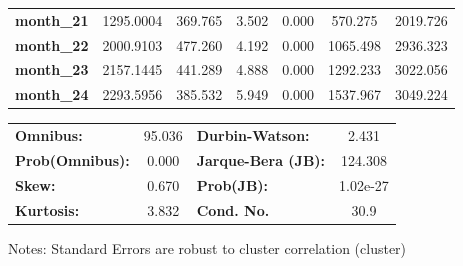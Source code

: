 \begin{center}
\begin{tabular}{lcccccc}
\textbf{month\_21}    &    1295.0004  &      369.765     &     3.502  &         0.000        &      570.275    &     2019.726     \\
\textbf{month\_22}    &    2000.9103  &      477.260     &     4.192  &         0.000        &     1065.498    &     2936.323     \\
\textbf{month\_23}    &    2157.1445  &      441.289     &     4.888  &         0.000        &     1292.233    &     3022.056     \\
\textbf{month\_24}    &    2293.5956  &      385.532     &     5.949  &         0.000        &     1537.967    &     3049.224     \\
\bottomrule
\end{tabular}
\begin{tabular}{lclc}
\textbf{Omnibus:}       & 95.036 & \textbf{  Durbin-Watson:     } &    2.431  \\
\textbf{Prob(Omnibus):} &  0.000 & \textbf{  Jarque-Bera (JB):  } &  124.308  \\
\textbf{Skew:}          &  0.670 & \textbf{  Prob(JB):          } & 1.02e-27  \\
\textbf{Kurtosis:}      &  3.832 & \textbf{  Cond. No.          } &     30.9  \\
\bottomrule
\end{tabular}
\end{center}

Notes: \newline
 [1] Standard Errors are robust to cluster correlation (cluster)